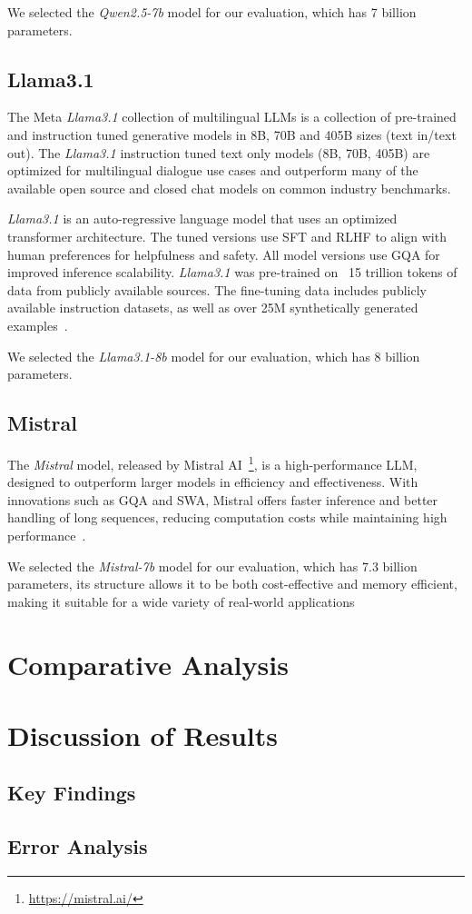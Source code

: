 We selected the \textit{Qwen2.5-7b} model for our evaluation, which has 7 billion parameters.

\subsection{Llama3.1}\label{subsec:empirical-evaluation:candidate-models:llama3.1}
The Meta \textit{Llama3.1} collection of multilingual LLMs is a collection of pre-trained and instruction tuned generative models in 8B, 70B and 405B sizes (text in/text out).
The \textit{Llama3.1} instruction tuned text only models (8B, 70B, 405B) are optimized for multilingual dialogue use cases and outperform many of the available open source and closed chat models on common industry benchmarks.

\textit{Llama3.1} is an auto-regressive language model that uses an optimized transformer architecture.
The tuned versions use \ac{SFT} and \ac{RLHF} to align with human preferences for helpfulness and safety.
All model versions use \ac{GQA} for improved inference scalability.
\textit{Llama3.1} was pre-trained on ~15 trillion tokens of data from publicly available sources.
The fine-tuning data includes publicly available instruction datasets, as well as over 25M synthetically generated examples~\cite{dubey2024llama3herdmodels,meta2023llama3}.

We selected the \textit{Llama3.1-8b} model for our evaluation, which has 8 billion parameters.

\subsection{Mistral}\label{subsec:empirical-evaluation:candidate-models:mistral}
The \textit{Mistral} model, released by Mistral AI~\footnote{\url{https://mistral.ai/}}, is a high-performance LLM, designed to outperform larger models in efficiency and effectiveness.
With innovations such as \ac{GQA} and \ac{SWA}, Mistral offers faster inference and better handling of long sequences, reducing computation costs while maintaining high performance~\cite{jiang2023mistral7b,mistral7b_2023}.

We selected the \textit{Mistral-7b} model for our evaluation, which has 7.3 billion parameters, its structure allows it to be both cost-effective and memory efficient, making it suitable for a wide variety of real-world applications
\section{Comparative Analysis}\label{sec:empirical-evaluation:comparative-analysis}

\section{Discussion of Results}\label{sec:empirical-evaluation:discussion-of-results}
\subsection{Key Findings}\label{subsec:empirical-evaluation:discussion-of-results:key-findings}
\subsection{Error Analysis}\label{subsec:empirical-evaluation:discussion-of-results:error-analysis}
